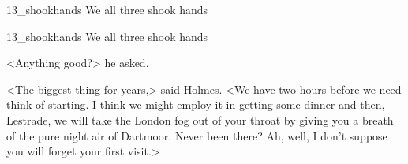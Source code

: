 
\begin{withoutfootnotes}
	\begin{letter}
		\begin{bwbigpic}
				[1.0]  
			{13_shookhands}
			{We all three shook hands}
		\end{bwbigpic}
	\end{letter}
	\begin{a4}
		\begin{bwbigpic}
				[1.0]  
			{13_shookhands}
			{We all three shook hands}
		\end{bwbigpic}
	\end{a4}
\end{withoutfootnotes}

<Anything good?> he asked.

<The biggest thing for years,> said Holmes. <We have two hours before we need think of starting. I think we might employ it in getting some dinner and then, Lestrade, we will take the London fog out of your throat by giving you a breath of the pure night air of Dartmoor. Never been there? Ah, well, I don't suppose you will forget your first visit.>

